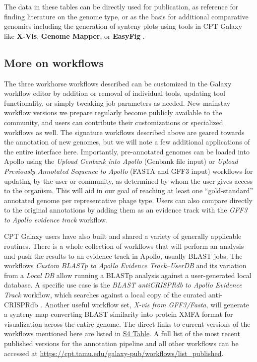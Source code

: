 The data in these tables can be directly used for publication, as
reference for finding literature on the genome type, or as the basis for
additional comparative genomics including the generation of synteny
plots using tools in CPT Galaxy like \textbf{X-Vis}, \textbf{Genome
Mapper}, or \textbf{EasyFig} \cite{Sullivan_2011}.

\subsection*{More on workflows}

The three workhorse workflows described can be customized in the Galaxy
workflow editor by addition or removal of individual tools, updating
tool functionality, or simply tweaking job parameters as needed. New
mainstay workflow versions we prepare regularly become publicly
available to the community, and users can contribute their
customizations or specialized workflows as well. The signature workflows
described above are geared towards the annotation of new genomes, but we
will note a few additional applications of the entire interface here.
Importantly, pre-annotated genomes can be loaded into Apollo using the
\emph{Upload Genbank into Apollo} (Genbank file input) or \emph{Upload
Previously Annotated Sequence to Apollo} (FASTA and GFF3 input)
workflows for updating by the user or community, as determined by whom
the user gives access to the organism. This will aid in our goal of
reaching at least one ``gold-standard'' annotated genome per
representative phage type. Users can also compare directly to the
original annotations by adding them as an evidence track with the
\emph{GFF3 to Apollo evidence track} workflow.

CPT Galaxy users have also built and shared a variety of generally
applicable routines. There is a whole collection of workflows that will
perform an analysis and push the results to an evidence track in Apollo,
usually BLAST jobs. The workflows \emph{Custom BLASTp to Apollo Evidence
Track--UserDB} and its variation from a \emph{Local DB} allow running a
BLASTp analysis against a user-generated local database. A specific use
case is the \emph{BLAST antiCRISPRdb to Apollo Evidence Track} workflow,
which searches against a local copy of the curated anti-CRISPRdb
\cite{Dong_2017}. Another useful workflow set, \emph{X-vis from GFF3/Fasta},
will generate a synteny map converting BLAST similarity into protein
XMFA format for visualization across the entire genome. The direct links
to current versions of the workflows mentioned here are listed in
\protect\hyperlink{pcbi.1008214.s004}{S4 Table}. A full list of the most
recent published versions for the annotation pipeline and all other
workflows can be accessed at
\url{https://cpt.tamu.edu/galaxy-pub/workflows/list_published}.

